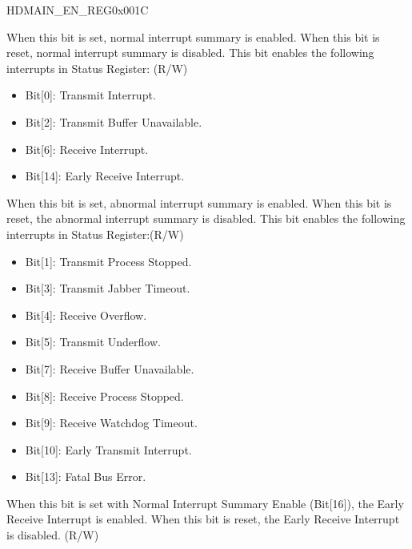 \begin{register}{H}{DMAIN\_EN\_REG}{0x001C}\label{regdesc:DMAINENREG}
%
%
%
%
%
%
%
%
%
%
%
%
%
%
%
%
%
\regnewline%
\begin{regdesc}\begin{reglist}
\item [DMAIN\_NISE]When this bit is set, normal interrupt summary is enabled. When this bit is reset, normal interrupt summary is disabled. This bit enables the following interrupts in Status Register: (R/W)
\begin{itemize}
\item Bit[0]: Transmit Interrupt. \item Bit[2]: Transmit Buffer Unavailable. \item Bit[6]: Receive Interrupt. \item Bit[14]: Early Receive Interrupt. \end{itemize}
\item [DMAIN\_AISE]When this bit is set, abnormal interrupt summary is enabled. When this bit is reset, the abnormal interrupt summary is disabled. This bit enables the following interrupts in Status Register:(R/W)\begin{itemize}
\item Bit[1]: Transmit Process Stopped.\item Bit[3]: Transmit Jabber Timeout.\item Bit[4]: Receive Overflow.\item Bit[5]: Transmit Underflow.\item Bit[7]: Receive Buffer Unavailable.\item Bit[8]: Receive Process Stopped.\item Bit[9]: Receive Watchdog Timeout.\item Bit[10]: Early Transmit Interrupt.\item Bit[13]: Fatal Bus Error. \end{itemize}
\item [DMAIN\_ERIE]When this bit is set with Normal Interrupt Summary Enable (Bit[16]), the Early Receive Interrupt is enabled. When this bit is reset, the Early Receive Interrupt is disabled. (R/W)
\item [Continued on the next page...]
\end{reglist}\end{regdesc}
\end{register}

